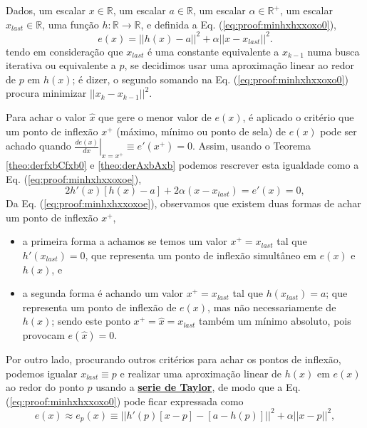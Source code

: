 \begin{myproofT}\label{proof:theo:minhxhxaxoxo}

Dados,
um escalar $x \in \mathbb{R}$, 
um escalar $a \in \mathbb{R}$,
um escalar $\alpha \in \mathbb{R}^{+}$,
um escalar $x_{last} \in \mathbb{R}$,
uma função $h:\mathbb{R} \rightarrow \mathbb{R}$, e 
definida a Eq. (\ref{eq:proof:minhxhxxoxo0}),
\begin{equation}\label{eq:proof:minhxhxxoxo0}
e(x)=||h(x)-a||^2+\alpha ||x-x_{last}||^2.
\end{equation}
tendo em consideração que $x_{last}$ é uma constante equivalente a $x_{k-1}$
numa busca iterativa ou equivalente a $p$, 
se decidimos usar uma aproximação linear ao redor de $p$ em $h(x)$; 
é dizer, o segundo somando na Eq. (\ref{eq:proof:minhxhxxoxo0}) 
procura minimizar $||x_{k}-x_{k-1}||^2$.


Para achar o valor  $\hat{x}$ que gere o menor valor de $e(x)$, é aplicado
o critério que um ponto de inflexão $x^+$ (máximo, mínimo ou ponto de sela) de $e(x)$ 
pode ser achado quando 
$\left. \frac{d e(x)}{d x }\right|_{x=x^+} \equiv e'(x^+) =0$.
Assim, 
usando o Teorema \ref{theo:derfxbCfxb0} e \ref{theo:derAxbAxb}  podemos 
rescrever esta igualdade como a Eq. (\ref{eq:proof:minhxhxxoxoe}),
\begin{equation}\label{eq:proof:minhxhxxoxoe}
2  h'(x) \left[h(x) -a\right]+2\alpha (x-x_{last})= e'(x)=0,
\end{equation}
Da Eq. (\ref{eq:proof:minhxhxxoxoe}), observamos 
que existem duas formas de achar um ponto de inflexão $x^+$,
\begin{itemize}
 \item a primeira forma a achamos se temos um valor $x^+=x_{last}$ tal que $h'(x_{last})=0$, 
que representa um ponto de inflexão simultâneo em $e(x)$ e $h(x)$, e
 \item a segunda forma é achando um valor $x^+=x_{last}$ tal que $h(x_{last})=a$;
que representa um ponto de inflexão de $e(x)$, mas não
necessariamente de $h(x)$; 
sendo este ponto $x^+=\hat{x}=x_{last}$ também um mínimo absoluto, pois provocam $e(\hat{x})=0$.
\end{itemize}

Por outro lado, procurando outros critérios para achar os pontos de inflexão,
podemos igualar $x_{last}\equiv p$ e 
realizar uma aproximação linear de $h(x)$ em $e(x)$
ao redor do ponto $p$ usando a \hyperref[def:taylor]{\textbf{serie de Taylor}},
de modo que a Eq. (\ref{eq:proof:minhxhxxoxo0}) pode ficar expressada como
\begin{equation}\label{eq:proof:minhxhxxoxo0approx}
e(x) \approx e_{p}(x)  \equiv ||h'(p)[x-p]-[a-h(p)]||^2+\alpha||x-p||^2,
\end{equation}



\end{myproofT}
